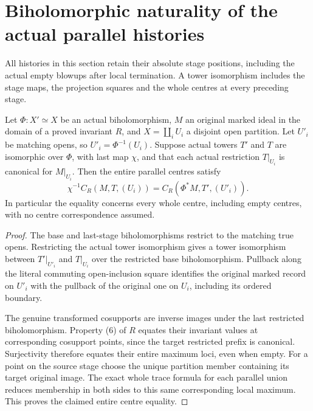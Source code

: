\section{Biholomorphic naturality of the actual parallel histories}
\label{sec:hironaka-componentwise-history-naturality}

All histories in this section retain their absolute stage positions,
including the actual empty blowups after local termination. A tower
isomorphism includes the stage maps, the projection squares and the
whole centres at every preceding stage.

\begin{theorem}
\label{hir:componentwise-parallel-centre-biholomorphic-transport}
\leanok
Let $\Phi:X'\simeq X$ be an actual biholomorphism, $M$ an original
marked ideal in the domain of a proved invariant $R$, and
$X=\coprod_iU_i$ a disjoint open partition. Let $U'_i$ be matching
opens, so $U'_i=\Phi^{-1}(U_i)$. Suppose actual towers $T'$ and $T$
are isomorphic over $\Phi$, with last map $\chi$, and that each
actual restriction $T|_{U_i}$ is canonical for $M|_{U_i}$.
Then the entire parallel centres satisfy
\[
 \chi^{-1}C_R(M,T,(U_i))
   =C_R(\Phi^*M,T',(U'_i)).
\]
In particular the equality concerns every whole centre, including
empty centres, with no centre correspondence assumed.
\end{theorem}
\begin{proof}
The base and last-stage biholomorphisms restrict to the matching
true opens. Restricting the actual tower isomorphism gives a
tower isomorphism between $T'|_{U'_i}$ and $T|_{U_i}$ over the
restricted base biholomorphism. Pullback along the literal
commuting open-inclusion square identifies the original marked
record on $U'_i$ with the pullback of the original one on $U_i$,
including its ordered boundary.

The genuine transformed cosupports are inverse images under
the last restricted biholomorphism. Property (6) of $R$ equates
their invariant values at corresponding cosupport points,
since the target restricted prefix is canonical. Surjectivity
therefore equates their entire maximum loci, even when empty.
For a point on the source stage choose the unique partition
member containing its target original image. The exact whole
trace formula for each parallel union reduces membership in
both sides to this same corresponding local maximum. This
proves the claimed entire centre equality.
\end{proof}

